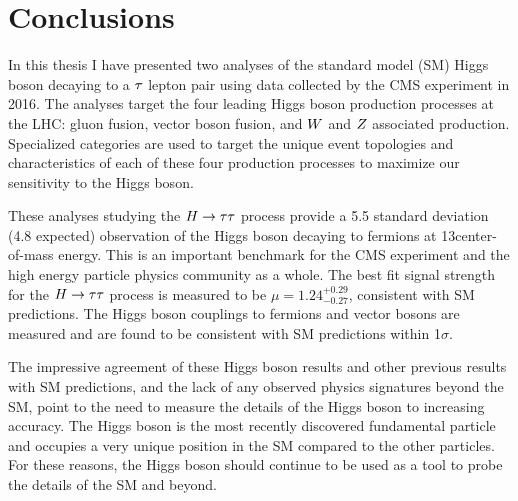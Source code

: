 \chapter{Conclusions}
\label{sec:conclusion}

In this thesis I have presented two analyses of the standard model (SM) Higgs boson decaying 
to a $\tau$ lepton pair using data collected by the CMS experiment in 2016.
The analyses target the four leading Higgs boson production processes at the LHC:
gluon fusion, vector boson fusion, and $W$ and $Z$ associated production.
Specialized categories are used to target the unique event topologies and 
characteristics of each of these four production processes to maximize our
sensitivity to the Higgs boson. 

These analyses studying the $H\to\tau\tau$ process provide a 5.5 standard deviation (4.8 expected)
observation of the Higgs boson decaying to fermions at 13\TeV center-of-mass energy. 
This is an important benchmark for the CMS experiment and the high energy
particle physics community as a whole.
The best fit signal strength for the $H\to\tau\tau$ process is measured to be 
$\mu = 1.24 ^{+0.29} _{-0.27}$, consistent with SM predictions.
The Higgs boson couplings to fermions and vector bosons are measured and are found to be
consistent with SM predictions within 1$\sigma$.

The impressive agreement of these Higgs boson results and other previous results
with SM predictions, and the lack of any observed physics signatures beyond
the SM, point to the need to measure the details of the Higgs boson to increasing
accuracy. The Higgs boson is the most recently discovered fundamental particle and occupies a very
unique position in the SM compared to the other particles. For these reasons,
the Higgs boson should continue to be used as a tool to probe the details of the SM and beyond.




